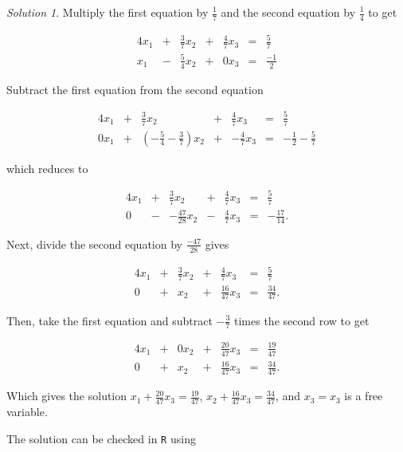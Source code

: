 \documentclass[
]{book}
\theoremstyle{definition}
\theoremstyle{definition}
\theoremstyle{definition}
\theoremstyle{remark}
\newtheorem*{solution}{Solution}
\begin{document}
\begin{solution}

Multiply the first equation by \(\frac{1}{7}\) and the second equation by \(\frac{1}{4}\) to get

\begin{alignat*}{4}
x_1 & {}+{} & \frac{3}{7} x_2 & {}+{} & \frac{4}{7} x_3 & {}={} & \frac{5}{7} \\
x_1 & {}-{} & \frac{5}{4} x_2 & {}+{} & 0 x_3       & {}={} & \frac{-1}{2}
\end{alignat*}

Subtract the first equation from the second equation

\begin{alignat*}{4}
x_1 & {}+{} & \frac{3}{7} x_2 & {}+{} & \frac{4}{7} x_3 & {}={} & \frac{5}{7} \\
0 x_1 & {}+{} &  (-\frac{5}{4} - \frac{3}{7}) x_2 &{}+{}& -\frac{4}{7} x_3  & {}={} & - \frac{1}{2} - \frac{5}{7}
\end{alignat*}

which reduces to

\begin{alignat*}{4}
x_1 & {}+{} & \frac{3}{7} x_2 & {}+{} & \frac{4}{7} x_3 & {}={} & \frac{5}{7} \\
0 & {}-{} &  -\frac{47}{28} x_2 &{}-{}& \frac{4}{7} x_3 & {}={} & -\frac{17}{14}.
\end{alignat*}

Next, divide the second equation by \(\frac{-47}{28}\) gives

\begin{alignat*}{4}
x_1 & {}+{} & \frac{3}{7} x_2 & {}+{} & \frac{4}{7} x_3 & {}={} & \frac{5}{7} \\
0 & {}+{} & x_2 &{}+{}& \frac{16}{47} x_3 & {}={} & \frac{34}{47}.
\end{alignat*}

Then, take the first equation and subtract \(-\frac{3}{7}\) times the second row to get

\begin{alignat*}{4}
x_1 & {}+{} & 0 x_2 & {}+{} & \frac{20}{47} x_3 & {}={} & \frac{19}{47} \\
0 & {}+{} & x_2 &{}+{}& \frac{16}{47} x_3 & {}={} & \frac{34}{47}.
\end{alignat*}

Which gives the solution
\(x_1 + \frac{20}{47} x_3 = \frac{19}{47}\), \(x_2 + \frac{16}{47} x_3 = \frac{34}{47}\), and \(x_3 = x_3\) is a free variable.

The solution can be checked in \texttt{R} using


\end{solution}
\end{document}
